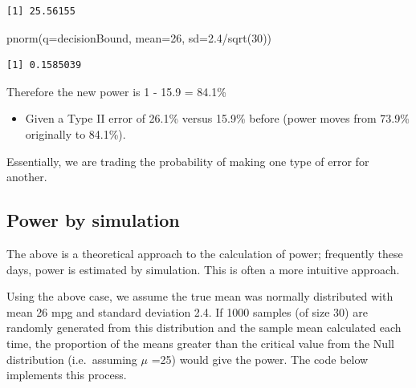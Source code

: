 \documentclass[
  oneside]{krantz}
\newenvironment{Shaded}{\begin{snugshade}}{\end{snugshade}}
\newcommand{\AttributeTok}[1]{\textcolor[rgb]{0.77,0.63,0.00}{#1}}
\newcommand{\DecValTok}[1]{\textcolor[rgb]{0.00,0.00,0.81}{#1}}
\newcommand{\FloatTok}[1]{\textcolor[rgb]{0.00,0.00,0.81}{#1}}
\newcommand{\FunctionTok}[1]{\textcolor[rgb]{0.00,0.00,0.00}{#1}}
\newcommand{\NormalTok}[1]{#1}
\newcommand{\SpecialCharTok}[1]{\textcolor[rgb]{0.00,0.00,0.00}{#1}}
\providecommand{\tightlist}{%
  \setlength{\itemsep}{0pt}\setlength{\parskip}{0pt}}
\begin{document}
\begin{verbatim}
[1] 25.56155
\end{verbatim}

\begin{Shaded}
\begin{Highlighting}[]
\FunctionTok{pnorm}\NormalTok{(}\AttributeTok{q=}\NormalTok{decisionBound, }\AttributeTok{mean=}\DecValTok{26}\NormalTok{, }\AttributeTok{sd=}\FloatTok{2.4}\SpecialCharTok{/}\FunctionTok{sqrt}\NormalTok{(}\DecValTok{30}\NormalTok{))}
\end{Highlighting}
\end{Shaded}

\begin{verbatim}
[1] 0.1585039
\end{verbatim}

Therefore the new power is 1 - 15.9 = 84.1\%

\begin{itemize}
\tightlist
\item
  Given a Type II error of 26.1\% versus 15.9\% before (power moves from 73.9\% originally to 84.1\%).
\end{itemize}

Essentially, we are trading the probability of making one type of error for another.

\hypertarget{power-by-simulation}{%
\subsection{Power by simulation}\label{power-by-simulation}}

The above is a theoretical approach to the calculation of power; frequently these days, power is estimated by simulation. This is often a more intuitive approach.

Using the above case, we assume the true mean was normally distributed with mean 26 mpg and standard deviation 2.4. If 1000 samples (of size 30) are randomly generated from this distribution and the sample mean calculated each time, the proportion of the means greater than the critical value from the Null distribution (i.e.~assuming \(\mu\) =25) would give the power. The code below implements this process.
\end{document}
